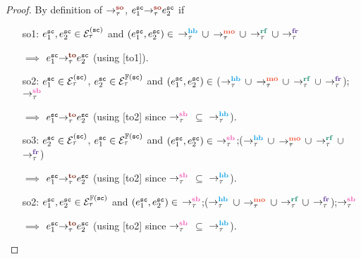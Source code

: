 {}
\begin{proof}
		By definition of $\setSO$, $\so{\tau}{e^\sc_1}{e^\sc_2}$ if
		\begin{itemize}[label=so4,align=left,leftmargin=*]
			\item [so1:] $e^\sc_1, e^\sc_2 \in \ordevents{\sc}_\tau$
				and $(e^\sc_1, e^\sc_2) \in$ $\setHB$ $\union$ 
				$\setMO$ $\union$ $\setRF$ $\union$ $\setFR$
				
				$\implies$ $\to{\tau}{e^\sc_1}{e^\sc_2}$
				(using [to1]).
				
			\item [so2:] $e^\sc_1 \in \ordevents{\sc}_\tau$,
				$e^\sc_2 \in \ordfences{\sc}_\tau$
				and $(e^\sc_1, e^\sc_2) \in$ ($\setHB$ $\union$ 
				$\setMO$ $\union$ $\setRF$ $\union$ $\setFR$);$\setSB$
			
				$\implies$ $\to{\tau}{e^\sc_1}{e^\sc_2}$
				(using [to2] since $\setSB$ $\subseteq$ $\setHB$).
				
			\item [so3:] $e^\sc_2 \in \ordevents{\sc}_\tau$,
				$e^\sc_1 \in \ordfences{\sc}_\tau$
				and $(e^\sc_1, e^\sc_2) \in$ $\setSB$;($\setHB$ 
				$\union$ $\setMO$ $\union$ $\setRF$ $\union$ $\setFR$)
			
				$\implies$ $\to{\tau}{e^\sc_1}{e^\sc_2}$
				(using [to2] since $\setSB$ $\subseteq$ $\setHB$).
				
			\item [so2:] $e^\sc_1, e^\sc_2 \in \ordfences{\sc}_\tau$
				and $(e^\sc_1, e^\sc_2) \in$ $\setSB$;($\setHB$ $\union$ 
				$\setMO$ $\union$ $\setRF$ $\union$ $\setFR$);$\setSB$
			
				$\implies$ $\to{\tau}{e^\sc_1}{e^\sc_2}$
				(using [to2] since $\setSB$ $\subseteq$ $\setHB$).
		\end{itemize}
\end{proof}



